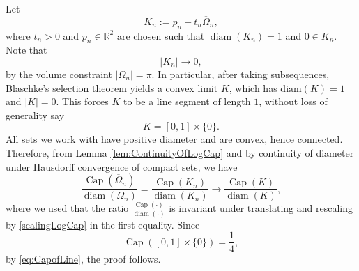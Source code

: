 \documentclass[11pt]{article}
\theoremstyle{plain}
\numberwithin{equation}{section}
\theoremstyle{definition}
\let\oldendproof\endproof
\renewenvironment{proof}[1][\proofname]{%
\oldproof[\upshape \bfseries #1]%
}{\oldendproof}
\DeclareMathOperator{\cp}{Cap}
\DeclareMathOperator{\diam}{diam}
\def \Om{\Omega}
\def \R {\mathbb{R}}
\begin{document}
    \begin{proof}
        Let
        \[
        K_n:=p_n+t_n\overline \Om_n,
        \]
        where $t_n>0$ and $p_n \in \R^2$ are chosen such that $\diam(K_n)=1$ and $0 \in K_n$. Note that
        \[
        |K_n|\to 0,
        \]
        by the volume constraint $|\Om_n|=\pi$. In particular, after taking subsequences, Blaschke's selection theorem yields a convex limit $K$, which has $\mathrm{diam}(K)=1$ and $|K| =0$. This forces $K$ to be a line segment of length $1$, without loss of generality say
        \[
        K=[0,1] \times\{0\}.
        \]
        All sets we work with have positive diameter and are convex, hence connected. Therefore, from Lemma \ref{lem:ContinuityOfLogCap} and by continuity of diameter under Hausdorff convergence of compact sets, we have
        \[
        \frac{\cp(\overline \Om_n)}{\diam(\Om_n)}=\frac{\cp(K_n)}{\diam(K_n)}\to\frac{\cp(K)}{\diam(K)},
        \]
        where we used that the ratio $\frac{\cp(\cdot)}{\diam(\cdot)}$ is invariant under translating and rescaling by \eqref{scalingLogCap} in the first equality. Since
        \[
        \cp([0,1]\times \{0\})=\frac{1}{4},
        \]
        by \eqref{eq:CapofLine}, the proof follows.
    \end{proof}
\end{document}
